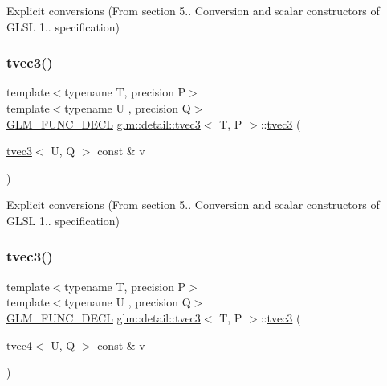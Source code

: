 Explicit conversions (From section 5.. Conversion and scalar constructors of G\+L\+SL 1.. specification) 

\mbox{\label{structglm_1_1detail_1_1tvec3_a54b078bacee2ec2449d2739d98f20ca4}} 
\subsubsection{\texorpdfstring{tvec3()}{tvec3()}\hspace{0.1cm}{\footnotesize\ttfamily [10/17]}}
{\footnotesize\ttfamily template$<$typename T, precision P$>$ \\
template$<$typename U , precision Q$>$ \\
\hyperlink{setup_8hpp_ab2d052de21a70539923e9bcbf6e83a51}{G\+L\+M\+\_\+\+F\+U\+N\+C\+\_\+\+D\+E\+CL} \hyperlink{structglm_1_1detail_1_1tvec3}{glm\+::detail\+::tvec3}$<$ T, P $>$\+::\hyperlink{structglm_1_1detail_1_1tvec3}{tvec3} (\begin{DoxyParamCaption}\item[{\hyperlink{structglm_1_1detail_1_1tvec3}{tvec3}$<$ U, Q $>$ const \&}]{v }\end{DoxyParamCaption})\hspace{0.3cm}{\ttfamily [explicit]}}



Explicit conversions (From section 5.. Conversion and scalar constructors of G\+L\+SL 1.. specification) 

\mbox{\label{structglm_1_1detail_1_1tvec3_aee034f5d37843761ab03ce2c279a0435}} 
\subsubsection{\texorpdfstring{tvec3()}{tvec3()}\hspace{0.1cm}{\footnotesize\ttfamily [11/17]}}
{\footnotesize\ttfamily template$<$typename T, precision P$>$ \\
template$<$typename U , precision Q$>$ \\
\hyperlink{setup_8hpp_ab2d052de21a70539923e9bcbf6e83a51}{G\+L\+M\+\_\+\+F\+U\+N\+C\+\_\+\+D\+E\+CL} \hyperlink{structglm_1_1detail_1_1tvec3}{glm\+::detail\+::tvec3}$<$ T, P $>$\+::\hyperlink{structglm_1_1detail_1_1tvec3}{tvec3} (\begin{DoxyParamCaption}\item[{\hyperlink{structglm_1_1detail_1_1tvec4}{tvec4}$<$ U, Q $>$ const \&}]{v }\end{DoxyParamCaption})\hspace{0.3cm}{\ttfamily [explicit]}}



